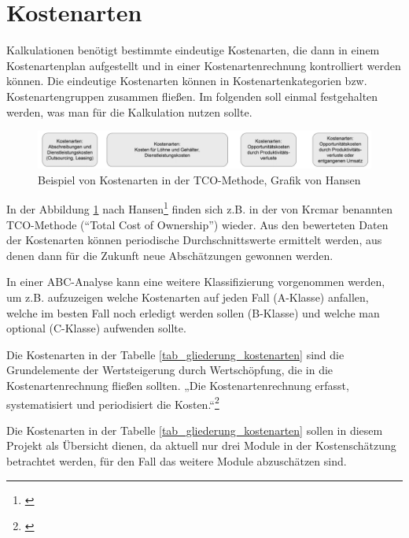 \section{Kostenarten}
\label{section_kostenarten}
Kalkulationen benötigt bestimmte eindeutige Kostenarten, die dann in einem Kostenartenplan aufgestellt und in einer Kostenartenrechnung kontrolliert werden können. Die eindeutige Kostenarten können in Kostenartenkategorien bzw. Kostenartengruppen zusammen fließen.  Im folgenden soll einmal festgehalten werden, was man für die Kalkulation nutzen sollte.

\begin{figure}[h!]
	\centering
	\includegraphics[width=\textwidth]{kapitel/gruppe4_2/bilder/beispiel_kostenarten_TCO}
	\caption{Beispiel von Kostenarten in der TCO-Methode, Grafik von Hansen}
	\label{fig_kostenarten_TCO}
\end{figure}

In der Abbildung \ref{fig_kostenarten_TCO} nach Hansen\footnote{\cite{hansen_business_2009}} finden sich z.B. in der von Krcmar benannten TCO-Methode (“Total Cost of Ownership”) wieder. Aus den bewerteten Daten der Kostenarten können periodische Durchschnittswerte ermittelt werden, aus denen dann für die Zukunft neue Abschätzungen gewonnen werden.

In einer ABC-Analyse kann eine weitere Klassifizierung vorgenommen werden, um z.B. aufzuzeigen welche Kostenarten auf jeden Fall (A-Klasse) anfallen, welche im besten Fall noch erledigt werden sollen (B-Klasse) und welche man optional (C-Klasse) aufwenden sollte.

Die Kostenarten in der Tabelle \ref{tab_gliederung_kostenarten} sind die Grundelemente der Wertsteigerung durch Wertschöpfung, die in die Kostenartenrechnung fließen sollten. „Die Kostenartenrechnung erfasst, systematisiert und periodisiert die Kosten.“\footnote{\cite{reim_erfolgsrechnung_2015}} 

Die Kostenarten in der Tabelle \ref{tab_gliederung_kostenarten} sollen in diesem Projekt als Übersicht dienen, da aktuell nur drei Module in der Kostenschätzung betrachtet werden, für den Fall das weitere Module abzuschätzen sind.


